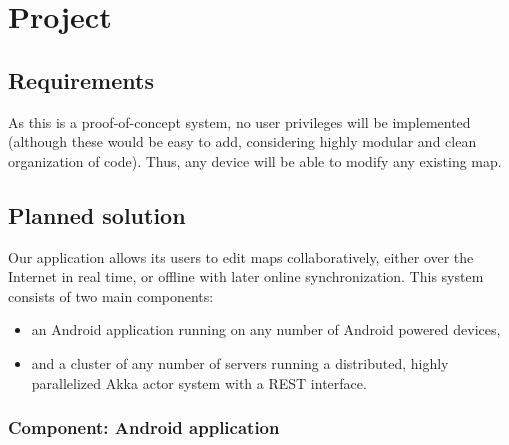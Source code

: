 %
%
%
%
%

\chapter{Project}
\label{chap:project}

\section{Requirements}
\label{sec:requirements}


As this is a proof-of-concept system, no user privileges will be implemented (although these would be easy to add, considering highly modular and clean organization of code). Thus, any device will be able to modify any existing map.

\section{Planned solution}
\label{sec:plan}

Our application allows its users to edit maps collaboratively, either over the Internet in real time, or offline with later online synchronization. This system consists of two main components:

\begin{itemize}
	\item an Android application running on any number of Android powered devices,
	\item and a cluster of any number of servers running a distributed, highly parallelized Akka actor system with a REST interface.
\end{itemize}

\subsection{Component: Android application}
\label{subsec:component-android}

